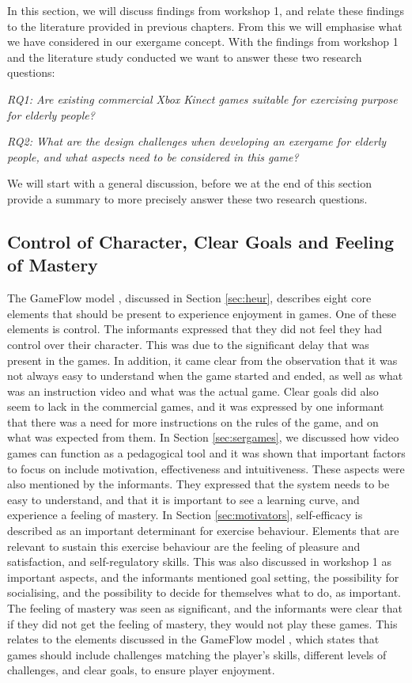 In this section, we will discuss findings from workshop 1, and relate these findings to the literature provided in previous chapters. From this we will emphasise what we have considered in our exergame concept. With the findings from workshop 1 and the literature study conducted we want to answer these two research questions: 

\emph{RQ1: Are existing commercial Xbox Kinect games suitable for exercising purpose for elderly people?}

\emph{RQ2: What are the design challenges when developing an exergame for elderly people, and what aspects need to be considered in this game?}

We will start with a general discussion, before we at the end of this section provide a summary to more precisely answer these two research questions. 

\subsection{Control of Character, Clear Goals and Feeling of Mastery}
The GameFlow model \cite{sweetser}, discussed in Section \ref{sec:heur}, describes eight core elements that should be present to experience enjoyment in games. One of these elements is control. The informants expressed that they did not feel they had control over their character. This was due to the significant delay that was present in the games. In addition, it came clear from the observation that it was not always easy to understand when the game started and ended, as well as what was an instruction video and what was the actual game. Clear goals did also seem to lack in the commercial games, and it was expressed by one informant that there was a need for more instructions on the rules of the game, and on what was expected from them. In Section \ref{sec:sergames}, we discussed how video games can function as a pedagogical tool and it was shown that important factors to focus on include motivation, effectiveness and intuitiveness. These aspects were also mentioned by the informants. They expressed that the system needs to be easy to understand, and that it is important to see a learning curve, and experience a feeling of mastery. In Section \ref{sec:motivators}, self-efficacy is described as an important determinant for exercise behaviour. Elements that are relevant to sustain this exercise behaviour are the feeling of pleasure and satisfaction, and self-regulatory skills. This was also discussed in workshop 1 as important aspects, and the informants mentioned goal setting, the possibility for socialising, and the possibility to decide for themselves what to do, as important. The feeling of mastery was seen as significant, and the informants were clear that if they did not get the feeling of mastery, they would not play these games. This relates to the elements discussed in the GameFlow model \cite{sweetser}, which states that games should include challenges matching the player's skills, different levels of challenges, and clear goals, to ensure player enjoyment. 

